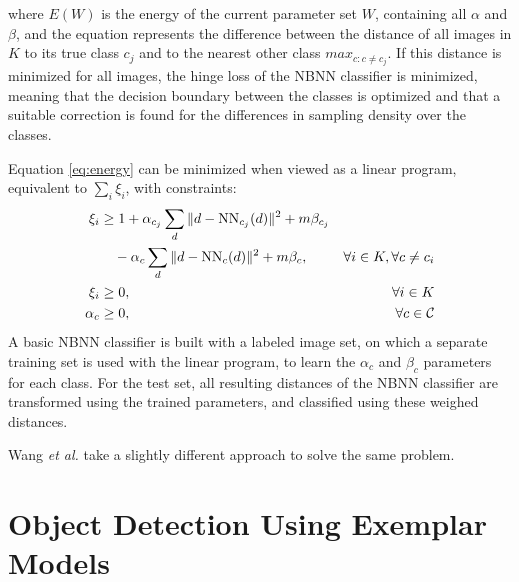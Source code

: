 \documentclass[a4paper,10pt]{article}
\begin{document}
where $E(W)$ is the energy of the current parameter set $W$, containing all $\alpha$ and $\beta$, and the equation represents the difference between the distance of all images in $K$ to its true class $c_j$ and to the nearest other class $max_{c:c\neq c_j}$. If this distance is minimized for all images, the hinge loss of the NBNN classifier is minimized, meaning that the decision boundary between the classes is optimized and that a suitable correction is found for the differences in sampling density over the classes.

Equation \eqref{eq:energy} can be minimized when viewed as a linear program, equivalent to $\sum_i \xi_i$, with constraints:
\begin{align}
    \xi_i &\geq 1 +\alpha_{c_j} \sum_d \|d - \text{NN}_{c_j}(d)\|^2 + m\beta_{c_j}&\notag\\
    \label{eq:linprog1}
    &\quad-\alpha_{c} \sum_d \|d - \text{NN}_{c}(d)\|^2 + m\beta_{c}, &\forall i \in K, \forall c \neq c_i\\
    \label{eq:linprog2}
    \xi_i &\geq 0, &\forall i \in K\\
    \label{eq:linprog3}
    \alpha_c &\geq 0, &\forall c \in \mathcal{C}
\end{align}
A basic NBNN classifier is built with a labeled image set, on which a separate training set is used with the linear program, to learn the $\alpha_c$ and $\beta_c$ parameters for each class. For the test set, all resulting distances of the NBNN classifier are transformed using the trained parameters, and classified using these weighed distances.

Wang \emph{et al.} take a slightly different approach to solve the same problem. 




\section{Object Detection Using Exemplar Models} %
\label{sec:object_detection}

\begin{figure}[hbt]
    \centering
\end{figure}
\end{document}
